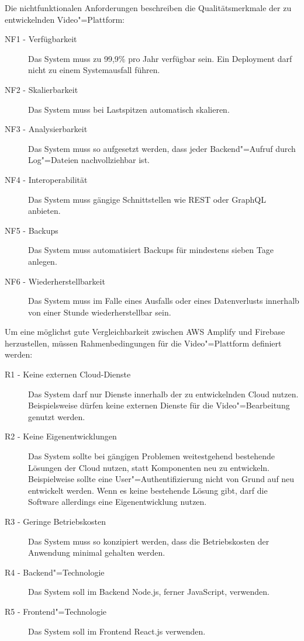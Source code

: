 Die nichtfunktionalen Anforderungen beschreiben die Qualitätsmerkmale der zu entwickelnden Video"=Plattform:
\begin{description}
   \item[NF1 - Verfügbarkeit] Das System muss zu 99,9\% pro Jahr verfügbar sein. Ein Deployment darf nicht zu einem Systemausfall führen.\label{NF1}
   \item[NF2 - Skalierbarkeit] Das System muss bei Lastspitzen automatisch skalieren.\label{NF2}
   \item[NF3 - Analysierbarkeit] Das System muss so aufgesetzt werden, dass jeder Backend"=Aufruf durch Log"=Dateien nachvollziehbar ist.\label{NF3}
   \item[NF4 - Interoperabilität] Das System muss gängige Schnittstellen wie REST oder GraphQL anbieten.\label{NF4}
   \item[NF5 - Backups] Das System muss automatisiert Backups für mindestens sieben Tage anlegen.\label{NF6}
   \item[NF6 - Wiederherstellbarkeit] Das System muss im Falle eines Ausfalls oder eines Datenverlusts innerhalb von einer Stunde wiederherstellbar sein.\label{NF7}
\end{description}

Um eine möglichst gute Vergleichbarkeit zwischen \ac{AWS} Amplify und Firebase herzustellen, müssen Rahmenbedingungen für die Video"=Plattform definiert werden:
\begin{description}
   \item[R1 - Keine externen Cloud-Dienste] Das System darf nur Dienste innerhalb der zu entwickelnden Cloud nutzen. Beispielsweise dürfen keine externen Dienste für die Video"=Bearbeitung genutzt werden.
   \item[R2 - Keine Eigenentwicklungen] Das System sollte bei gängigen Problemen weitestgehend bestehende Lösungen der Cloud nutzen, statt Komponenten neu zu entwickeln. Beispielweise sollte eine User"=Authentifizierung nicht von Grund auf neu entwickelt werden. Wenn es keine bestehende Lösung gibt, darf die Software allerdings eine Eigenentwicklung nutzen.
   \item[R3 - Geringe Betriebskosten] Das System muss so konzipiert werden, dass die Betriebskosten der Anwendung minimal gehalten werden.
   \item[R4 - Backend"=Technologie] Das System soll im Backend Node.js, ferner JavaScript, verwenden.
   \item[R5 - Frontend"=Technologie] Das System soll im Frontend React.js verwenden.
\end{description}